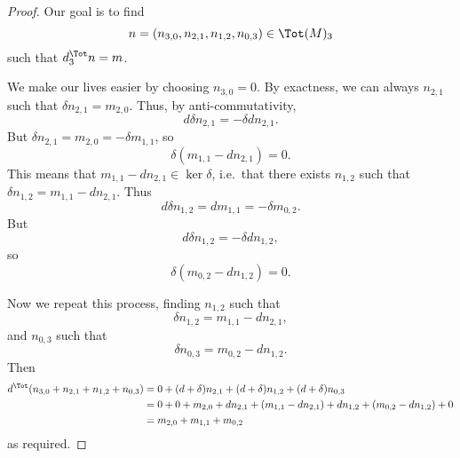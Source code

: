 \documentclass[main.tex]{subfiles}
\begin{document}
\begin{proof}
  Our goal is to find
  \begin{equation*}
    n = (n_{3,0}, n_{2,1}, n_{1,2}, n_{0,3}) \in \Tot(M)_{3}
  \end{equation*}
  such that $d^{\Tot}_{3}n = m$.

  We make our lives easier by choosing $n_{3,0} = 0$. By exactness, we can always $n_{2,1}$ such that $\delta n_{2,1} = m_{2,0}$. Thus, by anti-commutativity,
  \begin{equation*}
    d \delta n_{2,1} = -\delta d n_{2,1}.
  \end{equation*}
  But $\delta n_{2,1} = m_{2,0} = -\delta m_{1,1}$, so
  \begin{equation*}
    \delta(m_{1,1} - d n_{2,1}) = 0.
  \end{equation*}
  This means that $m_{1,1} - dn_{2,1} \in \ker \delta$, i.e.\ that there exists $n_{1,2}$ such that $\delta n_{1,2} = m_{1,1} - dn_{2,1}$. Thus
  \begin{equation*}
    d \delta n_{1,2} = d m_{1,1} = -\delta m_{0,2}.
  \end{equation*}
  But
  \begin{equation*}
    d \delta n_{1,2} = -\delta d n_{1,2},
  \end{equation*}
  so
  \begin{equation*}
    \delta(m_{0,2} - d n_{1,2}) = 0.
  \end{equation*}

  Now we repeat this process, finding $n_{1,2}$ such that
  \begin{equation*}
    \delta n_{1,2} = m_{1,1} - d n_{2,1},
  \end{equation*}
  and $n_{0,3}$ such that
  \begin{equation*}
    \delta n_{0,3} = m_{0,2} - d n_{1,2}.
  \end{equation*}
  Then
  \begin{align*}
    d^{\Tot}(n_{3,0} + n_{2,1} + n_{1,2} + n_{0,3}) &= 0 + (d + \delta) n_{2,1} + (d + \delta)n_{1,2} + (d + \delta) n_{0,3} \\
    &= 0 + 0 + m_{2,0} + d n_{2,1} + (m_{1,1} - dn_{2,1}) + d n_{1,2} + (m_{0,2} - d n_{1,2}) + 0 \\
    &= m_{2,0} + m_{1,1} + m_{0,2}
  \end{align*}
  as required.
\end{proof}
\end{document}
